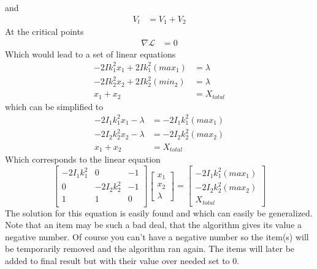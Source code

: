 \documentclass[11pt]{article}
\begin{document}
and
\begin{align*}
  V_t &= V_1 + V_2
\end{align*}
At the critical points
\begin{align*}
  \nabla \mathcal{L} &= 0
\end{align*}
Which would lead to a set of linear equations
\begin{align*}
  -2Ik_1^2x_1 + 2Ik_1^2(max_1) &= \lambda \\ 
  -2Ik_2^2x_2 + 2Ik_2^2(min_2) &= \lambda \\ 
  x_1 + x_2 &= X_{total}
\end{align*}
which can be simplified to
\begin{align*}
  -2I_1k_1^2x_1 - \lambda &=  -2I_1k_1^2(max_1)\\ 
  -2I_2k_2^2x_2 - \lambda &=  -2I_2k_2^2(max_2) \\ 
  x_1 + x_2 &= X_{total}
\end{align*}
Which corresponds to the linear equation
\begin{equation}
\begin{bmatrix}
  -2I_1k_1^2 & 0 & -1\\
  0 & -2I_2k_2^2 & -1\\
  1 & 1 & 0\\
\end{bmatrix}
\begin{bmatrix}
  x_1 \\ x_2 \\ \lambda
\end{bmatrix}
=
\begin{bmatrix}
  -2I_1k_1^2(max_1) \\ -2I_2k_2^2(max_2) \\ X_{total}
\end{bmatrix}
\end{equation}
The solution for this equation is easily found and which can easily be
generalized.
\\
Note that an item may be such a bad deal, that the algorithm gives its value a negative
number. Of course you can't have a negative number so the item(s) will be
temporarily removed and the algorithm ran again.  The items will later be added
to final result but with their value over needed set to 0.
\newpage
\end{document}
